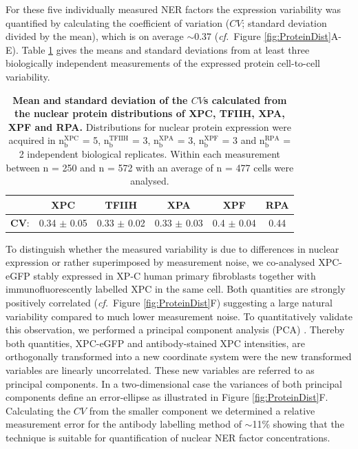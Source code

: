\clearpage
For these five individually measured NER factors the expression variability was quantified by calculating the coefficient of variation ($CV$; standard deviation divided by the mean), which is on average $\sim$0.37 (\textit{cf.}\ Figure \ref{fig:ProteinDist}A-E). Table \ref{tab:proteinVariability} gives the means and standard deviations from at least three biologically independent measurements of the expressed protein cell-to-cell variability.




\begin{table}[t!]
	\centering
	\begin{tabular}{cccccc}
		\hline
		\rule{0pt}{2ex}
		&\textbf{XPC} & \textbf{TFIIH} & \textbf{XPA} & \textbf{XPF} & \textbf{RPA}\\ \hline
		\rule{0pt}{3ex}
		$\mathbf{CV}$: & 0.34 $\pm$ 0.05 & 0.33 $\pm$ 0.02 & 0.33 $\pm$ 0.03 & 0.4 $\pm$ 0.04 & 0.44\\ \hline
		
	\end{tabular}
	\caption{\textbf{Mean and standard deviation of the $CV$s calculated from the nuclear protein distributions of XPC, TFIIH, XPA, XPF and RPA.} Distributions for nuclear protein expression were acquired in $\text{n}_{\text{b}}^{\text{XPC}}$ = 5, $\text{n}_{\text{b}}^{\text{TFIIH}}$ = 3, $\text{n}_{\text{b}}^{\text{XPA}}$ = 3, $\text{n}_{\text{b}}^{\text{XPF}}$ = 3 and $\text{n}_{\text{b}}^{\text{RPA}}$ = 2 independent biological replicates. Within each measurement between n = 250 and n = 572 with an average of n = 477 cells were analysed.}\label{tab:proteinVariability}
\end{table}      

To distinguish whether the measured variability is due to differences in nuclear expression or rather superimposed by measurement noise, we co-analysed XPC-eGFP stably expressed in XP-C human primary fibroblasts together with immunofluorescently labelled XPC in the same cell. Both quantities are strongly positively correlated (\textit{cf.}\ Figure \ref{fig:ProteinDist}F) suggesting a large natural variability compared to much lower measurement noise. To quantitatively validate this observation, we performed a principal component analysis (PCA) \label{sec:pca} \cite{Pearson1901}. Thereby both quantities, XPC-eGFP and antibody-stained XPC intensities, are orthogonally transformed into a new coordinate system were the new transformed variables are linearly uncorrelated. These new variables are referred to as principal components. In a two-dimensional case the variances of both principal components define an error-ellipse as illustrated in Figure \ref{fig:ProteinDist}F. Calculating the $CV$ from the smaller component we determined a relative measurement error for the antibody labelling method of $\sim$11\% showing that the technique is suitable for quantification of nuclear NER factor concentrations.
      


